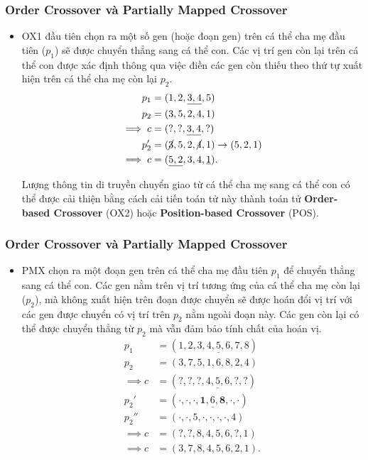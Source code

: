 \begin{frame}[fragile]
\frametitle{Order Crossover và Partially Mapped Crossover}
\begin{itemize}
\item 
OX1 đầu tiên chọn ra một số gen (hoặc đoạn gen) trên cá thể cha mẹ đầu tiên (\(
p_{1}\)) sẽ
được chuyển thẳng sang cá thể con. Các vị trí gen còn lại trên cá thể con được
xác định thông qua việc điền các gen còn thiếu theo thứ tự xuất hiện trên cá thể
cha mẹ còn lại \( p_{2} \).
\begin{align*}
  p_{1} &= (1, 2, \underline{3, 4}, 5) \\
  p_{2} &= (3, 5, 2, 4, 1)\\
  \implies c &= (?, ?, \underline{3, 4}, ?) \\
  p_{2}' &= (\cancel{3}, 5, 2, \cancel{4}, 1) \to  (5, 2, 1) \\
  \implies c&= (\underline{5, 2}, 3, 4, \underline{1})
.\end{align*}

Lượng thông tin di truyền chuyển giao từ cá thể cha mẹ sang cá thể con có thể
được cải thiện bằng cách cải tiến toán tử này thành toán tử \textbf{Order-based
Crossover} (OX2) hoặc \textbf{Position-based Crossover} (POS).
\end{itemize}
\end{frame}

\begin{frame}[fragile]
\frametitle{Order Crossover và Partially Mapped Crossover}
\begin{itemize}
\item 
PMX chọn ra một đoạn gen trên cá thể cha mẹ đầu tiên \( p_{1} \) để chuyển thẳng
sang cá thể con. Các gen nằm trên vị trí tương ứng của cá thể cha mẹ còn lại (\(
p_{2}\)), mà không xuất hiện trên đoạn được chuyển sẽ được hoán đổi vị trí với
các gen được chuyển có vị trí trên \( p_{2} \) nằm ngoài đoạn này. Các gen còn
lại có thể được chuyển thẳng từ \( p_{2} \) mà vẫn đảm bảo tính chất của hoán
vị.
\begin{align*}
  p_{1} &= (1, 2, 3, \underline{4, 5, 6}, 7, 8) \\
  p_{2} &=  (3, 7, 5, 1, 6, 8, 2, 4) \\
  \implies c &= (?, ?, ?, \underline{4, 5, 6}, ?, ?) \\
  p_{2}' &= (\cdot, \cdot, \cdot, \underline{\mathbf{1}, 6, \mathbf{8}}, \cdot,
  \cdot) \\
  p_{2}'' &= (\cdot, \cdot, 5, \cdot, \cdot, \cdot, \cdot, 4) \\
  \implies c &= (?, ?, 8, 4, 5, 6, ?, 1) \\
  \implies c&= (3, 7, 8, 4, 5, 6, 2, 1)
.\end{align*}
\end{itemize}
\end{frame}

